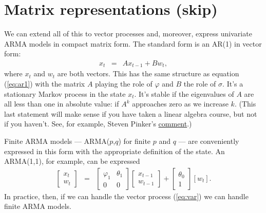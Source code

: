 \documentclass[11pt]{article}
\begin{document}
\section{Matrix representations (skip)}
\label{sec:matrix}


We can extend all of this to vector processes and, moreover,
express univariate ARMA models in compact matrix form.
The standard form is an AR(1) in vector form:
\begin{eqnarray}
    x_{t} &=& A x_{t-1} + B w_{t} ,
    \label{eq:var}
\end{eqnarray}
where $x_t$ and $w_t$ are both vectors.
This has the same structure as equation (\ref{eq:ar1}) with the matrix $A$
playing the role of $\varphi$ and $B$ the role of $\sigma$.
It's a stationary Markov process in the state $x_t$.
It's stable if the eigenvalues of $A$ are all less than one in absolute value:
if $A^k$ approaches zero as we increase $k$.
(This last statement will make sense if you have taken a linear algebra course, 
but not if you haven't.  
See, for example, Steven Pinker's 
\href{http://www.nytimes.com/2009/11/15/books/review/Pinker-t.html?pagewanted=all&_r=0}{comment}.) 

Finite ARMA models ---
ARMA($p$,$q$) for finite $p$ and $q$ ---
are conveniently expressed in this form with the appropriate definition
of the state.
An ARMA(1,1), for example, can be expressed
\begin{eqnarray*}
    \left[
    \begin{array}{c}
    x_t \\ w_t
    \end{array}
    \right]
    &=&
    \left[
    \begin{array}{cc}
    \varphi_1 & \theta_1 \\ 0 & 0
    \end{array}
    \right]
    \left[
    \begin{array}{c}
    x_{t-1} \\ w_{t-1}
    \end{array}
    \right]
    +
    \left[
    \begin{array}{c}
    \theta_0 \\ 1
    \end{array}
    \right]
    [w_t ] .
\end{eqnarray*}
In practice, then,
if we can handle the vector process (\ref{eq:var})
we can handle finite ARMA models.

\end{document}

